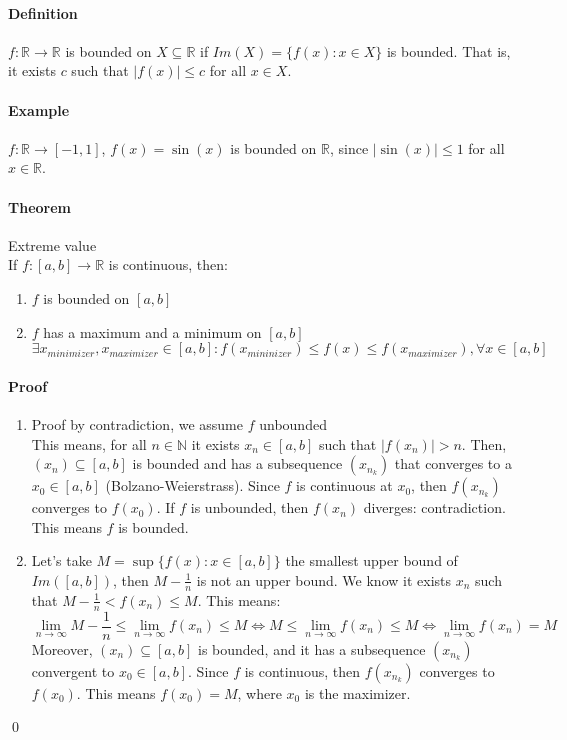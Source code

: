 \documentclass{article}
\newcommand{\abs}[1]{\left|#1\right|}
\newcommand{\func}[3]{#1 : #2 \rightarrow #3}
\newcommand{\functoR}[2]{#1 : #2 \rightarrow \mathbb{R}}
\newcommand{\funcR}[1]{#1 : \mathbb{R} \rightarrow \mathbb{R}}
\newcommand{\limn}{\lim_{n \to \infty}}
\newcommand{\intcc}[1]{\left[#1\right]}
\newcommand{\N}{\mathbb{N}}
\newcommand{\R}{\mathbb{R}}
\newcommand{\Def}{\paragraph{Definition}}
\newcommand{\Theorem}{\paragraph{Theorem}}
\newcommand{\Proof}{\paragraph{Proof}}
\newcommand{\Example}{\paragraph{Example}}
\begin{document}
  \Def $\funcR{f}$ is bounded on $X \subseteq \R$ if $Im(X) = \{ f(x) : x \in X
  \}$ is bounded. That is, it exists $c$ such that $\abs{f(x)} \leq c$ for all
  $x \in X$.

  \Example $\func{f}{\R}{\intcc{-1,1}}$, $f(x) = \sin(x)$ is bounded on $\R$,
  since $\abs{\sin(x)} \leq 1$ for all $x \in \R$.

  \Theorem Extreme value
\\If $\functoR{f}{\intcc{a,b}}$ is continuous, then:
  \begin{enumerate}[label=(\roman*)]
    \item $f$ is bounded on $\intcc{a,b}$
    \item $f$ has a maximum and a minimum on $\intcc{a,b}$
  \\$\exists x_{minimizer}, x_{maximizer} \in \intcc{a,b} :
  f(x_{mininizer}) \leq f(x) \leq f(x_{maximizer}), \forall x \in \intcc{a,b}$
  \end{enumerate}

  \Proof
  \begin{enumerate}[label=(\roman*)]
    \item Proof by contradiction, we assume $f$ unbounded
  \\This means, for all $n \in \N$ it exists $x_n \in \intcc{a,b}$ such that
    $\abs{f(x_n)} > n$. Then, $(x_n) \subseteq \intcc{a,b}$ is bounded and has
    a subsequence $(x_{n_k})$ that converges to a $x_0 \in \intcc{a,b}$
    (Bolzano-Weierstrass). Since $f$ is continuous at $x_0$, then $f(x_{n_k})$
    converges to $f(x_0)$. If $f$ is unbounded, then $f(x_n)$ diverges:
    contradiction. This means $f$ is bounded.

    \item Let's take $M = \sup\{ f(x) : x \in \intcc{a,b} \}$ the smallest upper
    bound of $Im(\intcc{a,b})$, then $M - \frac{1}{n}$ is not an upper bound.
    We know it exists $x_n$ such that $M - \frac{1}{n} < f(x_n) \leq M$. This
    means:
    \begin{equation*}
      \limn{M - \frac{1}{n}} \leq \limn{f(x_n)} \leq M \iff
      M \leq \limn{f(x_n)} \leq M \iff \limn{f(x_n)} = M
    \end{equation*}
    Moreover, $(x_n) \subseteq \intcc{a,b}$ is bounded, and it has a subsequence
    $(x_{n_k})$ convergent to $x_0 \in \intcc{a,b}$. Since $f$ is continuous,
    then $f(x_{n_k})$ converges to $f(x_0)$. This means $f(x_0) = M$, where
    $x_0$ is the maximizer.
  \end{enumerate}
  \qed
\end{document}
